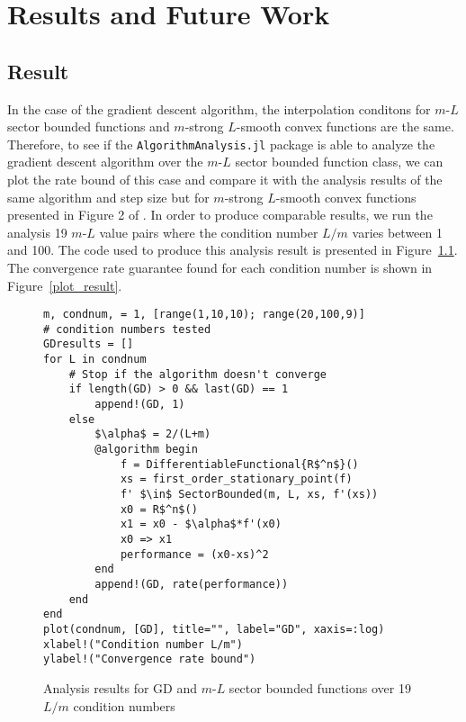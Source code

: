 \chapter{Results and Future Work}\label{chapter:Conclusion}
\section{Result}
In the case of the gradient descent algorithm, the interpolation conditons for $m$-$L$ sector bounded functions and $m$-strong $L$-smooth convex functions are the same. Therefore, to see if the \texttt{AlgorithmAnalysis.jl} package is able to analyze the gradient descent algorithm over the $m$-$L$ sector bounded function class, we can plot the rate bound of this case and compare it with the analysis results of the same algorithm and step size but for $m$-strong $L$-smooth convex functions presented in Figure 2 of \cite{tutorial}. In order to produce comparable results, we run the analysis 19 $m$-$L$ value pairs where the condition number $L/m$ varies between 1 and 100. The code used to produce this analysis result is presented in Figure~\ref{ex_tested_result}. The convergence rate guarantee found for each condition number is shown in Figure~\ref{plot_result}.
\begin{figure}[h!]
	\begin{lstlisting}[mathescape]
m, condnum, = 1, [range(1,10,10); range(20,100,9)]
# condition numbers tested
GDresults = []
for L in condnum
    # Stop if the algorithm doesn't converge
    if length(GD) > 0 && last(GD) == 1
        append!(GD, 1)
    else
        $\alpha$ = 2/(L+m)
        @algorithm begin
            f = DifferentiableFunctional{R$^n$}()
            xs = first_order_stationary_point(f)
            f' $\in$ SectorBounded(m, L, xs, f'(xs))
            x0 = R$^n$()
            x1 = x0 - $\alpha$*f'(x0)
            x0 => x1
            performance = (x0-xs)^2
        end
        append!(GD, rate(performance))
    end
end
plot(condnum, [GD], title="", label="GD", xaxis=:log)
xlabel!("Condition number L/m")
ylabel!("Convergence rate bound")
\end{lstlisting}
\caption{Analysis results for GD and $m$-$L$ sector bounded functions over 19 $L/m$ condition numbers}
\label{ex_tested_result}
\end{figure}
    
